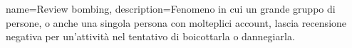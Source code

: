 {
	name={Review bombing},
	description={Fenomeno in cui un grande gruppo di persone, o anche una singola persona con molteplici account, lascia recensione negativa per un'attività nel tentativo di boicottarla o dannegiarla.}
}